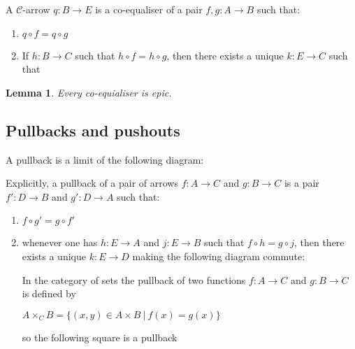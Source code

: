 \documentclass[a4paper]{article}
\theoremstyle{defin}
\theoremstyle{theorem}
\theoremstyle{claim}
\theoremstyle{prop}
\theoremstyle{lemma}
\newtheorem{lemma}{Lemma}
\theoremstyle{fact}
\theoremstyle{ex}
\theoremstyle{col}
\begin{document}
A $\mathcal{C}$-arrow $q : B \to E$ is a co-equaliser of a pair $f, g : A \to B$ such that:
\begin{enumerate}
\item $q \circ f = q \circ g$
\item If $h : B \to C$ such that $h \circ f = h \circ g$, then there exists a unique $k : E \to C$ such that

\centerline{
}
\end{enumerate}

\begin{lemma}
Every co-equialiser is epic.
\end{lemma}

\subsection{Pullbacks and pushouts}

A pullback is a limit of the following diagram:

\centerline{
}

Explicitly, a pullback of a pair of arrows $f : A \to C$ and $g : B \to C$ is a pair $f' : D \to B$ and $g' : D \to A$ such that:
\begin{enumerate}
\item $f \circ g' = g \circ f'$
\item whenever one has $h : E \to A$ and $j : E \to B$ such that $f \circ h = g \circ j$, then there exists a unique $k : E \to D$ making the following diagram commute:

\centerline{
}

In the category of sets the pullback of two functions $f : A \to C$ and $g : B \to C$ is defined by
\begin{center}
$A \times_C B = \{ (x, y) \in A \times B \: | \: f(x) = g(x) \}$
\end{center}
so the following square is a pullback

\centerline{
}
\end{enumerate}
\end{document}
